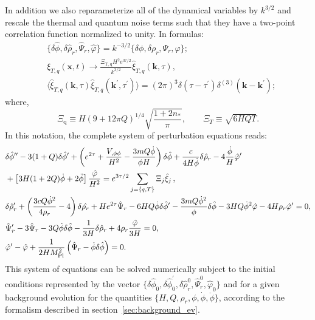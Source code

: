 \documentclass[a4paper,11pt]{article}
\begin{document}
In addition we also reparameterize all of the dynamical variables by $k^{3/2}$ and rescale the thermal 
 and quantum noise terms such that they have a two-point correlation function normalized to unity. In formulas: 
\begin{align}
&\{\delta\hat{\phi},\delta\hat{\rho}_r,\hat{\Psi}_r,\hat{\varphi}\}=k^{-3/2}\{\delta\phi,\delta\rho_r,\Psi_r,\varphi\}; \label{eq:3.14}\\
&\xi_{T,q}(\mathbf{x},t)\rightarrow \frac{\Xi_{\mathrm{T,q}}H^2e^{3\tau/2}}{k^{3/2}}\hat{\xi}_{T,q}(\mathbf{k},\tau),  \\
&\langle\hat{\xi}_{T,q}(\mathbf{k},\tau) \hat{\xi}_{T,q}(\mathbf{k}^\prime,\tau^\prime)\rangle=(2\pi)^3\delta\left(\tau-\tau^{\prime}\right) \delta^{(3)}(\mathbf{k}-\mathbf{k}^{\prime});
\end{align}
where,
\begin{equation}
    \Xi_{\mathrm{q}}\equiv H(9+12\pi Q)^{1/4}\sqrt{\frac{1+2n_*}{\pi}}, \qquad \Xi_T\equiv \sqrt{6H QT}. 
    \label{eq:noise_amps}
\end{equation}
In this notation, the complete system of perturbation equations reads:
\begin{align}
    &\delta \hat{\phi}^{\prime\prime}-3 (1+Q) \delta \hat{\phi}^\prime+\left(e^{2\tau}+\frac{V_{, \phi \phi}}{H^2}-\frac{3mQ \dot{\phi}}{\phi H}\right) \delta \hat{\phi} +\frac{ c}{4 H \dot{\phi}} \delta \hat{\rho}_r -4\frac{\dot{\phi}}{H}\hat{\varphi}^{\prime}  \nonumber \\
    &+\left[3H(1+2Q)\dot{\phi}+2\Ddot{\phi}\right]\frac{\hat{\varphi}}{H^2}=e^{3\tau/2}\sum_{j=\{q,T\}} \Xi_j \hat{\xi}_j\,, \label{eq:Gab2.1} \\
    &\delta \hat{\rho}^\prime_r+\left(\frac{3c Q \dot{\phi}^2}{4 \rho_r}-4\right) \delta \hat{\rho_r}+He^{2\tau}\hat{\Psi}_r-6 H Q \dot{\phi} \delta \hat{\phi}^\prime -\frac{3m Q \dot{\phi}^2}{\phi} \delta \hat{\phi}-3HQ\dot{\phi}^2\hat{\varphi}-4H\rho_r\hat{\varphi}^\prime=0, \label{eq:Gab2.2}\\ 
    &\hat{\Psi}^\prime_r-3 \hat{\Psi}_r-3Q \dot{\phi} \delta \hat{\phi}-\frac{1}{3H} \delta \hat{\rho}_r+4 \rho_r \frac{\hat{\varphi}}{3H}=0, \label{eq:Gab2.3} \\
      &\hat{\varphi}^\prime - \hat{\varphi}+ \frac{1}{2H M_{\mathrm{Pl}}^2}\left(\hat{\Psi}_r- \dot{\phi} \delta \hat{\phi}\right)=0. \label{eq:Gab2.4}
\end{align}
This system of equations can be solved numerically subject to the initial conditions represented by the vector $\{\delta \hat{\phi}_0,\delta\hat{\phi}^\prime_0,\delta \hat{\rho}^0_r, \hat{\Psi}^0_r,\hat{\varphi}_0\}$
and for a given background evolution for the quantities $\{H,Q,\rho_r,\phi,\dot{\phi},\ddot{\phi}\}$, according to the formalism described in section~\ref{sec:background_ev}.
\end{document}
